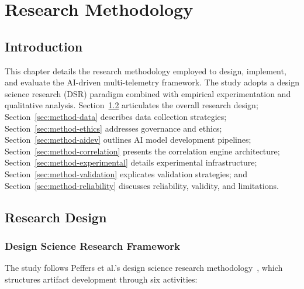 \chapter{Research Methodology}\label{chap:method}

\section{Introduction}\label{sec:method-intro}
This chapter details the research methodology employed to design, implement, and evaluate the AI-driven multi-telemetry framework. The study adopts a design science research (DSR) paradigm combined with empirical experimentation and qualitative analysis. Section~\ref{sec:method-design} articulates the overall research design; Section~\ref{sec:method-data} describes data collection strategies; Section~\ref{sec:method-ethics} addresses governance and ethics; Section~\ref{sec:method-aidev} outlines AI model development pipelines; Section~\ref{sec:method-correlation} presents the correlation engine architecture; Section~\ref{sec:method-experimental} details experimental infrastructure; Section~\ref{sec:method-validation} explicates validation strategies; and Section~\ref{sec:method-reliability} discusses reliability, validity, and limitations.

\section{Research Design}\label{sec:method-design}
\subsection{Design Science Research Framework}
The study follows Peffers et al.'s design science research methodology~\cite{peffers2007dsrm}, which structures artifact development through six activities:

